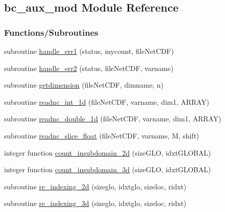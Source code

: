 \hypertarget{namespacebc__aux__mod}{}\subsection{bc\+\_\+aux\+\_\+mod Module Reference}
\label{namespacebc__aux__mod}
\subsubsection*{Functions/\+Subroutines}
\begin{DoxyCompactItemize}
\item 
subroutine \mbox{\hyperlink{namespacebc__aux__mod_a777b6d03acb56d99a3cc8787363990cc}{handle\+\_\+err1}} (status, mycount, file\+Net\+C\+DF)
\item 
subroutine \mbox{\hyperlink{namespacebc__aux__mod_a921a799abc5965966b4b8b3abf38f762}{handle\+\_\+err2}} (status, file\+Net\+C\+DF, varname)
\item 
subroutine \mbox{\hyperlink{namespacebc__aux__mod_af1f153076dc7ab8e6f5843cd84dc8394}{getdimension}} (file\+Net\+C\+DF, dimname, n)
\item 
subroutine \mbox{\hyperlink{namespacebc__aux__mod_aa7b33e356dcb9e7b401b43449826fcd7}{readnc\+\_\+int\+\_\+1d}} (file\+Net\+C\+DF, varname, dim1, A\+R\+R\+AY)
\item 
subroutine \mbox{\hyperlink{namespacebc__aux__mod_a1d34b587fdb3cda345dfbe1f8520a4a3}{readnc\+\_\+double\+\_\+1d}} (file\+Net\+C\+DF, varname, dim1, A\+R\+R\+AY)
\item 
subroutine \mbox{\hyperlink{namespacebc__aux__mod_aeeaf654e97d1f0eddf0f866614744f32}{readnc\+\_\+slice\+\_\+float}} (file\+Net\+C\+DF, varname, M, shift)
\item 
integer function \mbox{\hyperlink{namespacebc__aux__mod_a04b336a053ee0b434aed95659a1c1eab}{count\+\_\+insubdomain\+\_\+2d}} (size\+G\+LO, idxt\+G\+L\+O\+B\+AL)
\item 
integer function \mbox{\hyperlink{namespacebc__aux__mod_ad07d86b4193104bf6371002e745c603e}{count\+\_\+insubdomain\+\_\+3d}} (size\+G\+LO, idxt\+G\+L\+O\+B\+AL)
\item 
subroutine \mbox{\hyperlink{namespacebc__aux__mod_a4007772a42498f64a755720d6ef86c6c}{re\+\_\+indexing\+\_\+2d}} (sizeglo, idxtglo, sizeloc, ridxt)
\item 
subroutine \mbox{\hyperlink{namespacebc__aux__mod_ab96eacd816b887e1ed257e11c342b7c6}{re\+\_\+indexing\+\_\+3d}} (sizeglo, idxtglo, sizeloc, ridxt)
\end{DoxyCompactItemize}


